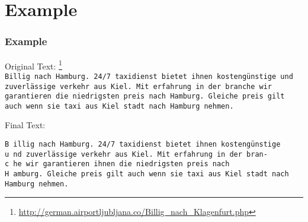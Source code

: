 \documentclass{beamer}
\begin{document}
\section{Example}
\begin{frame}

\frametitle{Example}
Original Text: \footnote{\tiny \url{http://german.airportljubljana.co/Billig\_nach\_Klagenfurt.php}} \\
\texttt{\scriptsize Billig nach Hamburg. 24/7 taxidienst bietet ihnen kostengünstige und \\
zuverlässige verkehr aus Kiel. Mit erfahrung in der branche wir \\
garantieren die niedrigsten preis nach Hamburg. Gleiche preis gilt \\
auch wenn sie taxi aus Kiel stadt nach Hamburg nehmen. \\}

Final Text: \par

\texttt{\footnotesize{B} \scriptsize illig nach Hamburg. 24/7 taxidienst bietet ihnen kostengünstige \\
\footnotesize{u} \scriptsize nd zuverlässige verkehr aus Kiel. Mit erfahrung in der bran- \\
\footnotesize{c} \scriptsize he wir garantieren ihnen die niedrigsten preis nach \\
\footnotesize{H} \scriptsize amburg. Gleiche preis gilt auch wenn sie taxi aus Kiel stadt nach \\
Hamburg nehmen. \\}
\end{frame}


\end{document}
